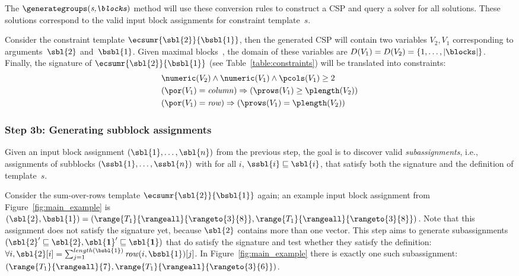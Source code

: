The $\generategroups(\textit{s,\blocks})$ method will use these conversion rules to construct a CSP and query a solver for all solutions.
These solutions correspond to the valid input block assignments for constraint template~$s$.

\begin{example}

  Consider the constraint template $\ecsumr{\sbl{2}}{\bsbl{1}}$, then the generated CSP will contain two variables $V_2, V_1$ corresponding to arguments~$\sbl{2}$ and~$\bsbl{1}$.
  Given maximal blocks~\blocks, the domain of these variables are $D(V_1) = D(V_2) = \{ 1, \dots, |\blocks| \}$.
  Finally, the signature of $\ecsumr{\sbl{2}}{\bsbl{1}}$ (see Table~\ref{table:constraints}) will be translated into constraints:
  \begin{align*}
    & \numeric(V_2) \land \numeric(V_1) \land \pcols(V_1) \geq 2 \\
    & (\por(V_1) = \mathit{column}) \Rightarrow (\prows(V_1) \geq \plength(V_2)) \\
    & (\por(V_1) = \mathit{row}) \Rightarrow (\prows(V_1) = \plength(V_2))
  \end{align*}
\end{example}




\subsubsection*{Step 3b: Generating subblock assignments}
\label{sec:algo:subgr}

Given an input block assignment $(\sbl{1}, \dots, \sbl{n})$ from the previous step, the goal is to discover valid \textit{subassignments}, i.e., assignments of subblocks $(\ssbl{1}, \dots, \ssbl{n})$ with for all $i$, $\ssbl{i} \sqsubseteq \sbl{i}$, that satisfy both the signature and the definition of template~$s$.

\begin{example}
  Consider the sum-over-rows template $\ecsumr{\sbl{2}}{\bsbl{1}}$ again;
  an example input block assignment from Figure~\ref{fig:main_example} is $(\sbl{2}, \bsbl{1}) = (\range{T_1}{\rangeall}{\rangeto{3}{8}}, \range{T_1}{\rangeall}{\rangeto{3}{8}})$.
  Note that this assignment does not satisfy the signature yet, because $\sbl{2}$ contains more than one vector.
  This step aims to generate subassignments $(\sbl{2}' \sqsubseteq \sbl{2}, \mathbf{\sbl{1}}' \sqsubseteq \mathbf{\sbl{1}})$ that do satisfy the signature and test whether they satisfy the definition:
  $\forall i, \sbl{2}[i] = \sum_{j = 1}^{length(\bsbl{1})} \mathit{row}(i, \bsbl{1})[j]$.
  In Figure~\ref{fig:main_example} there is exactly one such subassignment: $(\range{T_1}{\rangeall}{7}, \range{T_1}{\rangeall}{\rangeto{3}{6}})$.
\end{example}

